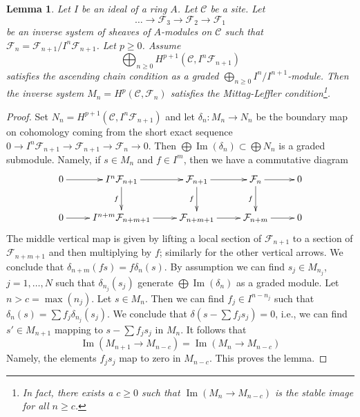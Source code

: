 \documentclass[10pt,a4paper]{amsart}
\theoremstyle{plain}
\newtheorem{lemma}[subsection]{Lemma}
\theoremstyle{definition}
\theoremstyle{remark}
\numberwithin{equation}{subsection}
\def\Im{\mathop{\mathrm{Im}}}
\begin{document}
\begin{lemma}
\label{lemma-ML-general}
Let $I$ be an ideal of a ring $A$. Let $\mathcal{C}$ be a site.
Let
$$
\ldots \to \mathcal{F}_3 \to \mathcal{F}_2 \to \mathcal{F}_1
$$
be an inverse system of sheaves of $A$-modules on $\mathcal{C}$
such that $\mathcal{F}_n = \mathcal{F}_{n + 1}/I^n\mathcal{F}_{n + 1}$.
Let $p \geq 0$. Assume
$$
\bigoplus\nolimits_{n \geq 0} H^{p + 1}(\mathcal{C}, I^n\mathcal{F}_{n + 1})
$$
satisfies the ascending chain condition as a graded
$\bigoplus_{n \geq 0} I^n/I^{n + 1}$-module.
Then the inverse system $M_n = H^p(\mathcal{C}, \mathcal{F}_n)$ satisfies the
Mittag-Leffler condition\footnote{In fact, there exists
a $c \geq 0$ such that $\Im(M_n \to M_{n - c})$ is the stable image
for all $n \geq c$.}.
\end{lemma}

\begin{proof}
Set $N_n = H^{p + 1}(\mathcal{C}, I^n\mathcal{F}_{n + 1})$ and let
$\delta_n : M_n \to N_n$ be the boundary map on cohomology
coming from the short exact sequence
$0 \to I^n\mathcal{F}_{n + 1} \to \mathcal{F}_{n + 1} \to \mathcal{F}_n \to 0$.
Then $\bigoplus \Im(\delta_n) \subset \bigoplus N_n$ is a graded submodule.
Namely, if $s \in M_n$ and $f \in I^m$, then we have a commutative diagram
$$
\xymatrix{
0 \ar[r] &
I^n\mathcal{F}_{n + 1} \ar[d]_f \ar[r] &
\mathcal{F}_{n + 1} \ar[d]_f \ar[r] &
\mathcal{F}_n \ar[d]_f \ar[r] & 0 \\
0 \ar[r] &
I^{n + m}\mathcal{F}_{n + m + 1} \ar[r] &
\mathcal{F}_{n + m + 1} \ar[r] &
\mathcal{F}_{n + m} \ar[r] & 0
}
$$
The middle vertical map is given by lifting a local section of
$\mathcal{F}_{n + 1}$ to a section of $\mathcal{F}_{n + m + 1}$
and then multiplying by $f$; similarly for the other vertical arrows.
We conclude that $\delta_{n + m}(fs) = f \delta_n(s)$.
By assumption we can find $s_j \in M_{n_j}$, $j = 1, \ldots, N$
such that $\delta_{n_j}(s_j)$
generate $\bigoplus \Im(\delta_n)$ as a graded module. Let $n > c = \max(n_j)$.
Let $s \in M_n$. Then we can find $f_j \in I^{n - n_j}$ such that
$\delta_n(s) = \sum f_j \delta_{n_j}(s_j)$. We conclude that
$\delta(s - \sum f_j s_j) = 0$, i.e., we can find $s' \in M_{n + 1}$
mapping to $s - \sum f_js_j$ in $M_n$. It follows that
$$
\Im(M_{n + 1} \to M_{n - c}) = \Im(M_n \to M_{n - c})
$$
Namely, the elements $f_js_j$ map to zero in $M_{n - c}$.
This proves the lemma.
\end{proof}
\end{document}
